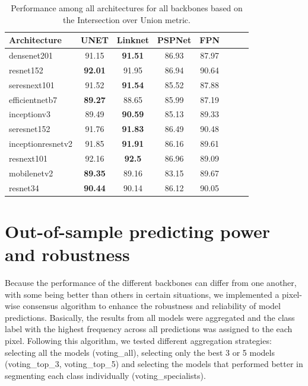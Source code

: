 \begin{table}[H]
    \centering
    \caption{Performance among all architectures for all backbones based on
        the Intersection over Union metric.}
    \label{tab:metrics-architectures}
    \begin{tabular}{lccccccc}
        \toprule
        \textbf{Architecture} & \textbf{UNET}  & \textbf{Linknet} &
        \textbf{PSPNet}       &
        \textbf{FPN}
        \\
        \midrule
        densenet201           & 91.15          & \textbf{91.51}   & 86.93
                              & 87.97
        \\
        resnet152             & \textbf{92.01} & 91.95            & 86.94
                              & 90.64
        \\
        seresnext101          & 91.52          & \textbf{91.54}   & 85.52
                              & 87.88
        \\
        efficientnetb7        & \textbf{89.27} & 88.65            & 85.99
                              & 87.19
        \\
        inceptionv3           & 89.49          & \textbf{90.59}   & 85.13
                              & 89.33
        \\
        seresnet152           & 91.76          & \textbf{91.83}   & 86.49
                              & 90.48
        \\
        inceptionresnetv2     & 91.85          & \textbf{91.91}   & 86.16
                              & 89.61
        \\
        resnext101            & 92.16          & \textbf{92.5}    & 86.96
                              & 89.09
        \\
        mobilenetv2           & \textbf{89.35} & 89.16            & 83.15
                              & 89.67
        \\
        resnet34              & \textbf{90.44} & 90.14            & 86.12
                              & 90.05
        \\
        \bottomrule
    \end{tabular}
\end{table}

\section{Out-of-sample predicting power and
  robustness}\label{app:out_of_sample}

Because the performance of the different backbones can differ from one
another, with some being better than others in certain situations, we
implemented a pixel-wise consensus algorithm to enhance the robustness and
reliability of model predictions. Basically, the results from all models were
aggregated and the class label with the highest frequency across all
predictions was assigned to the each pixel. Following this algorithm, we tested
different aggregation strategies: selecting all the models (voting\_all),
selecting only the best 3 or 5 models (voting\_top\_3, voting\_top\_5) and
selecting the models that performed better in segmenting each class
individually (voting\_specialists).

